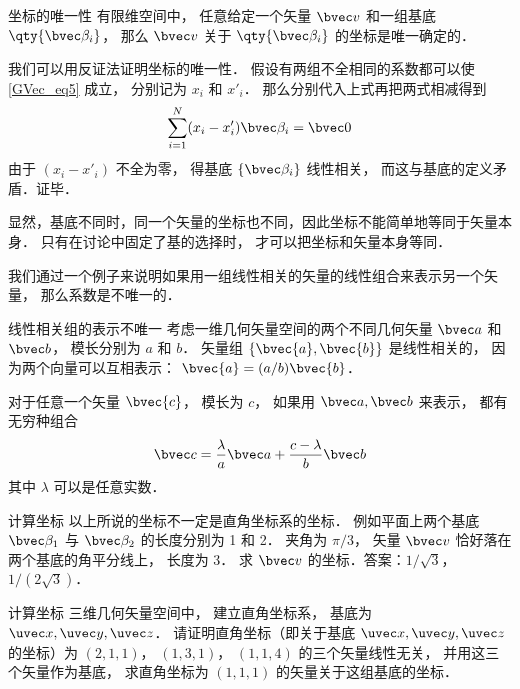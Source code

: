 \begin{theorem}{坐标的唯一性}
有限维空间中， 任意给定一个矢量 $\bvec v$ 和一组基底 $\qty{\bvec \beta_i}$， 那么 $\bvec v$ 关于 $\qty{\bvec \beta_i}$ 的坐标是唯一确定的．
\end{theorem}
我们可以用反证法证明坐标的唯一性． 假设有两组不全相同的系数都可以使\autoref{GVec_eq5} 成立， 分别记为 $x_i$ 和 $x'_i$． 那么分别代入上式再把两式相减得到
\begin{equation}
\sum_{i=1}^N (x_i-x'_i) \bvec \beta_i = \bvec 0
\end{equation}
由于 $(x_i-x'_i)$ 不全为零， 得基底 $\{\bvec \beta_i\}$ 线性相关， 而这与基底的定义矛盾．证毕．

显然，基底不同时，同一个矢量的坐标也不同，因此坐标不能简单地等同于矢量本身． 只有在讨论中固定了基的选择时， 才可以把坐标和矢量本身等同．

我们通过一个例子来说明如果用一组线性相关的矢量的线性组合来表示另一个矢量， 那么系数是不唯一的．

\begin{example}{线性相关组的表示不唯一}
考虑一维几何矢量空间的两个不同几何矢量 $\bvec a$ 和 $\bvec b$， 模长分别为 $a$ 和 $b$． 矢量组 $\{\bvec{a}, \bvec{b}\}$ 是线性相关的， 因为两个向量可以互相表示： $\bvec{a}=(a/b)\bvec{b}$．

对于任意一个矢量 $\bvec{c}$， 模长为 $c$， 如果用 $\bvec a, \bvec b$ 来表示， 都有无穷种组合
\begin{equation}
\bvec c = \frac{\lambda}{a} \bvec a + \frac{c - \lambda}{b} \bvec b
\end{equation}
其中 $\lambda$ 可以是任意实数．
\end{example}

\begin{exercise}{计算坐标}
以上所说的坐标不一定是直角坐标系的坐标． 例如平面上两个基底 $\bvec \beta_1$ 与 $\bvec \beta_2$ 的长度分别为 1 和 2． 夹角为 $\pi/3$， 矢量 $\bvec v$ 恰好落在两个基底的角平分线上， 长度为 3． 求 $\bvec v$ 的坐标．答案：$1/\sqrt 3$， $1/(2\sqrt 3)$．
\end{exercise}

\begin{exercise}{计算坐标}
三维几何矢量空间中， 建立直角坐标系， 基底为 $\uvec x, \uvec y, \uvec z$． 请证明直角坐标（即关于基底 $\uvec x, \uvec y, \uvec z$ 的坐标）为 $(2, 1, 1)$， $(1, 3, 1)$， $(1, 1, 4)$ 的三个矢量线性无关， 并用这三个矢量作为基底， 求直角坐标为 $(1, 1, 1)$ 的矢量关于这组基底的坐标．
\end{exercise}

